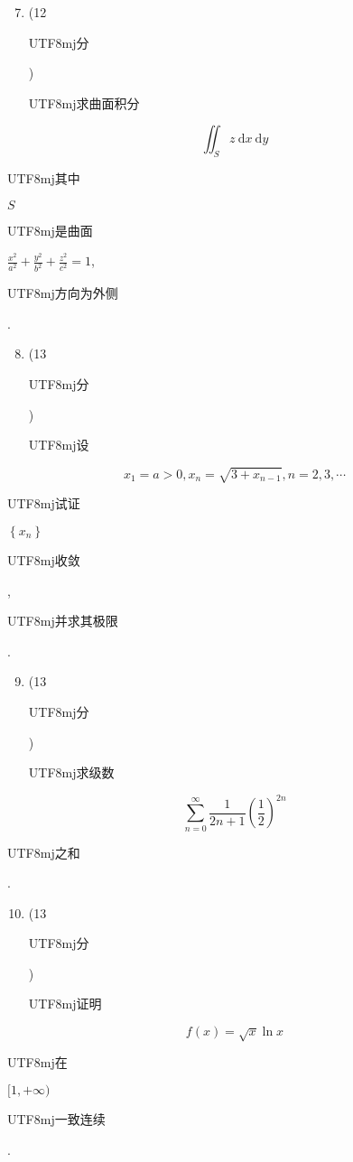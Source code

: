 \documentclass[10pt]{article}
\begin{document}
\begin{enumerate}
  \setcounter{enumi}{6}
  \item (12 \begin{CJK}{UTF8}{mj}分\end{CJK}) \begin{CJK}{UTF8}{mj}求曲面积分\end{CJK}
\end{enumerate}
$$
\iint_{S} z \mathrm{~d} x \mathrm{~d} y
$$
\begin{CJK}{UTF8}{mj}其中\end{CJK} $S$ \begin{CJK}{UTF8}{mj}是曲面\end{CJK} $\frac{x^{2}}{a^{2}}+\frac{y^{2}}{b^{2}}+\frac{z^{2}}{c^{2}}=1$, \begin{CJK}{UTF8}{mj}方向为外侧\end{CJK}.

\begin{enumerate}
  \setcounter{enumi}{7}
  \item (13 \begin{CJK}{UTF8}{mj}分\end{CJK}) \begin{CJK}{UTF8}{mj}设\end{CJK}
\end{enumerate}
$$
x_{1}=a>0, x_{n}=\sqrt{3+x_{n-1}}, n=2,3, \cdots
$$
\begin{CJK}{UTF8}{mj}试证\end{CJK} $\left\{x_{n}\right\}$ \begin{CJK}{UTF8}{mj}收敛\end{CJK}, \begin{CJK}{UTF8}{mj}并求其极限\end{CJK}.

\begin{enumerate}
  \setcounter{enumi}{8}
  \item (13 \begin{CJK}{UTF8}{mj}分\end{CJK}) \begin{CJK}{UTF8}{mj}求级数\end{CJK}
\end{enumerate}
$$
\sum_{n=0}^{\infty} \frac{1}{2 n+1}\left(\frac{1}{2}\right)^{2 n}
$$
\begin{CJK}{UTF8}{mj}之和\end{CJK}.

\begin{enumerate}
  \setcounter{enumi}{9}
  \item (13 \begin{CJK}{UTF8}{mj}分\end{CJK}) \begin{CJK}{UTF8}{mj}证明\end{CJK}
\end{enumerate}
$$
f(x)=\sqrt{x} \ln x
$$
\begin{CJK}{UTF8}{mj}在\end{CJK} $[1,+\infty)$ \begin{CJK}{UTF8}{mj}一致连续\end{CJK}.
\end{document}
